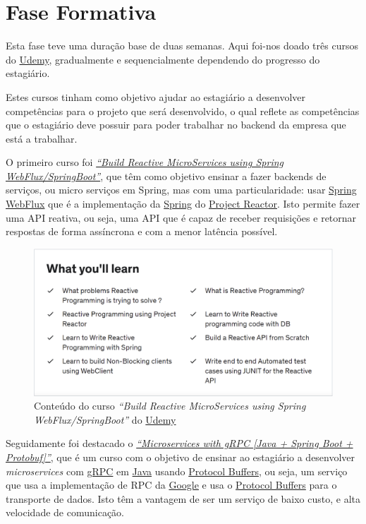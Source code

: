 \newpage

\section{Fase Formativa}

Esta fase teve uma duração base de duas semanas. Aqui foi-nos doado três cursos do \href{https://www.udemy.com/}{Udemy}, gradualmente e sequencialmente dependendo do progresso do estagiário.

Estes cursos tinham como objetivo ajudar ao estagiário a desenvolver competências para o projeto que será desenvolvido, o qual reflete as competências que o estagiário deve possuir para poder trabalhar no backend da empresa que está a trabalhar.

O primeiro curso foi \href{https://www.udemy.com/course/build-reactive-restful-apis-using-spring-boot-webflux/}{\textit{``Build Reactive MicroServices using Spring WebFlux/SpringBoot''}}, que têm como objetivo ensinar a fazer backends de serviços, ou micro serviços em Spring, mas com uma particularidade: usar \href{https://spring.io/reactive}{Spring WebFlux} que é a implementação da \href{https://spring.io/}{Spring} do \href{https://projectreactor.io/}{Project Reactor}. Isto permite fazer uma API reativa, ou seja, uma API que é capaz de receber requisições e retornar respostas de forma assíncrona e com a menor latência possível.

\begin{figure}[!hbt]
  \centering
  \includegraphics[width=14cm]{figuras/udemy1.png}
  \caption{Conteúdo do curso \textit{``Build Reactive MicroServices using Spring WebFlux/SpringBoot''} do \href{https://www.udemy.com/}{Udemy}}
  \label{fig:udemy1}
\end{figure}
\FloatBarrier

Seguidamente foi destacado o \href{https://www.udemy.com/course/grpc-the-complete-guide-for-java-developers/}{\textit{``Microservices with gRPC [Java + Spring Boot + Protobuf]''}}, que é um curso com o objetivo de ensinar ao estagiário a desenvolver \textit{microservices} com \href{https://grpc.io/}{gRPC} em \href{https://jdk.java.net/}{Java} usando \href{https://developers.google.com/protocol-buffers}{Protocol Buffers}, ou seja, um serviço que usa a implementação de RPC da \href{https://abc.xyz/}{Google} e usa o \href{https://developers.google.com/protocol-buffers}{Protocol Buffers} para o transporte de dados. Isto têm a vantagem de ser um serviço de baixo custo, e alta velocidade de comunicação.

